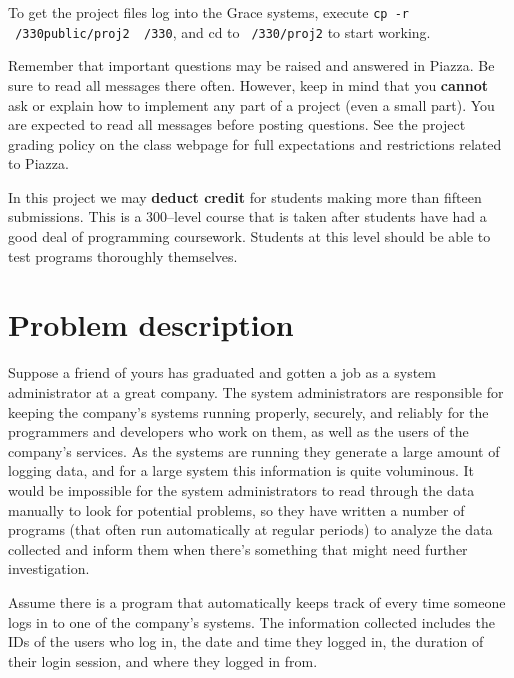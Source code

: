 \documentclass[11pt]{article}
\begin{document}
    To get the project files log into the Grace systems, execute
  \texttt{cp -r \string~/330public/proj2 \string~/330}, and cd to
  \texttt{\string~/330/proj2} to start working.

    Remember that important questions may be raised and answered
  in Piazza.  Be sure to read all messages there often.
  However, keep in mind that you \textbf{cannot} ask or explain how to
  implement any part of a project (even a small part).  You are expected to
  read all messages before posting questions.  See the project grading policy
  on the class webpage for full expectations and restrictions related to
  Piazza.

    In this project we may \textbf{deduct credit} for students making more
  than fifteen submissions.  This is a 300--level course that is taken after
  students have had a good deal of programming coursework.  Students at this
  level should be able to test programs thoroughly themselves.

  \section{Problem description}

    Suppose a friend of yours has graduated and gotten a job as a system
  administrator at a great company.  The system administrators are
  responsible for keeping the company's systems running properly, securely,
  and reliably for the programmers and developers who work on them, as well
  as the users of the company's services.  As the systems are running they
  generate a large amount of logging data, and for a large system this
  information is quite voluminous.  It would be impossible for the system
  administrators to read through the data manually to look for potential
  problems, so they have written a number of programs (that often run
  automatically at regular periods) to analyze the data collected and inform
  them when there's something that might need further investigation.

    Assume there is a program that automatically keeps track of every time
  someone logs in to one of the company's systems.  The information
  collected includes the IDs of the users who log in, the date and time they
  logged in, the duration of their login session, and where they logged in
  from.
\end{document}
